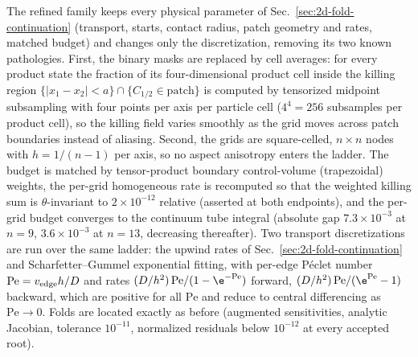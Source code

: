 The refined family keeps every physical parameter of
Sec.~\ref{sec:2d-fold-continuation} (transport, starts, contact radius,
patch geometry and rates, matched budget) and changes only the
discretization, removing its two known pathologies. First, the binary
masks are replaced by cell averages: for every product state the fraction
of its four-dimensional product cell inside the killing region
\(\{|x_1-x_2|<a\}\cap\{C_{1/2}\in\text{patch}\}\) is computed by tensorized
midpoint subsampling with four points per axis per particle cell
(\(4^4=256\) subsamples per product cell), so the killing field varies
smoothly as the grid moves across patch boundaries instead of aliasing.
Second, the grids are square-celled, \(n\times n\) nodes with
\(h=1/(n-1)\) per axis, so no aspect anisotropy enters the ladder. The
budget is matched by tensor-product boundary control-volume (trapezoidal)
weights, the per-grid homogeneous rate is recomputed so that the weighted
killing sum is \(\theta\)-invariant to \(2\times10^{-12}\) relative
(asserted at both endpoints), and the per-grid budget converges to the
continuum tube integral (absolute gap \(7.3\times10^{-3}\) at \(n=9\),
\(3.6\times10^{-3}\) at \(n=13\), decreasing thereafter). Two transport
discretizations are run over the same ladder: the upwind rates of
Sec.~\ref{sec:2d-fold-continuation} and Scharfetter--Gummel exponential
fitting, with per-edge P\'eclet number \(\mathrm{Pe}=v_{\rm edge}h/D\) and
rates \((D/h^2)\,\mathrm{Pe}/(1-\e^{-\mathrm{Pe}})\) forward,
\((D/h^2)\,\mathrm{Pe}/(\e^{\mathrm{Pe}}-1)\) backward, which are positive
for all \(\mathrm{Pe}\) and reduce to central differencing as
\(\mathrm{Pe}\to0\). Folds are located exactly as before (augmented
sensitivities, analytic Jacobian, tolerance \(10^{-11}\), normalized
residuals below \(10^{-12}\) at every accepted root).

